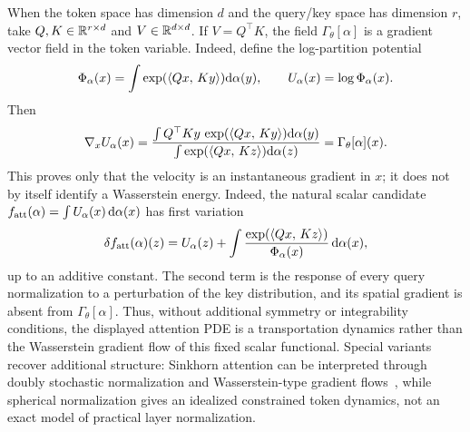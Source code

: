 When the token space has dimension $d$ and the query/key space has dimension $r$, take $Q,K\in\mathbb{R}^{r\times d}$ and $V\in\mathbb{R}^{d\times d}$. If $V=Q^\top K$, the field $\Gamma_\theta[\alpha]$ is a gradient vector field in the token variable. Indeed, define the log-partition potential
\[
	\Phi_\alpha(x)
	=
	\int \exp(\langle Qx,\,Ky\rangle)\mathrm{d}\alpha(y),
	\qquad
	U_\alpha(x)=\log\Phi_\alpha(x).
\]
Then
\[
	\nabla_x U_\alpha(x)
	=
	\frac{\int Q^\top K y\,\exp(\langle Qx,\,Ky\rangle)\mathrm{d}\alpha(y)}
	     {\int \exp(\langle Qx,\,Kz\rangle)\mathrm{d}\alpha(z)}
	=
	\Gamma_\theta[\alpha](x).
\]
This proves only that the velocity is an instantaneous gradient in $x$; it does not by itself identify a Wasserstein energy. Indeed, the natural scalar candidate $f_{\rm att}(\alpha)=\int U_\alpha(x)\,\mathrm{d}\alpha(x)$ has first variation
\[
	\delta f_{\rm att}(\alpha)(z)
	=
	U_\alpha(z)
	+
	\int
	\frac{\exp(\langle Qx,\,Kz\rangle)}{\Phi_\alpha(x)}
	\,\mathrm{d}\alpha(x),
\]
up to an additive constant. The second term is the response of every query normalization to a perturbation of the key distribution, and its spatial gradient is absent from $\Gamma_\theta[\alpha]$. Thus, without additional symmetry or integrability conditions, the displayed attention PDE is a transportation dynamics rather than the Wasserstein gradient flow of this fixed scalar functional. Special variants recover additional structure: Sinkhorn attention can be interpreted through doubly stochastic normalization and Wasserstein-type gradient flows~\cite{Sander2022Sinkformers,Castin2025DynamicsTransformers}, while spherical normalization gives an idealized constrained token dynamics, not an exact model of practical layer normalization.

